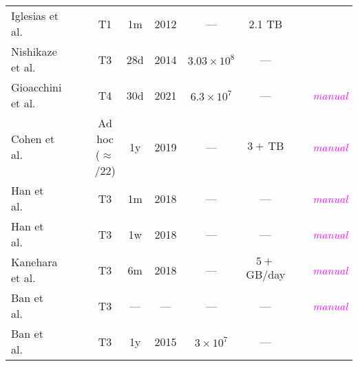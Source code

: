\documentclass[manuscript,nonacm]{acmart}
\newcommand{\cmark}{\ding{51}}%
\newcommand{\xmark}{\ding{55}}%
\newcommand{\wc}[1]{\textit{\textcolor{magenta}{#1}}} %
\begin{document}
\begin{table*}[h!]
\begin{tabular}{@{}lccccccccc@{}}
		Iglesias et al.~\cite{2019iglesias}                    
		& \xmark & \cmark           
		& T1
		& 1m    & 2012    
		& ---                  
		& 2.1 TB        
		& \xmark            
		& \xmark          \\
		
		Nishikaze et al.~\cite{2015nishikaze}                  
		& \xmark & \xmark           
		& T3         
		& 28d   & 2014    
		& $3.03\times10^{8}$
		& ---              
		& \xmark            
		& \xmark          \\
		
		Gioacchini et al.~\cite{2021gioacchini,2023gioacchini} 
		& \cmark & \cmark           
		& T4           
		& 30d   & 2021    
		& $6.3\times10^{7}$ 
		& ---              
		& \cmark~\cite{2020cohen} 
		& \wc{manual}    \\
		
		Cohen et al.~\cite{2020cohen}                          
		& \xmark & \cmark 
		& Ad hoc ($\approx$/22)		              
		& 1y    & 2019    
		& ---                  
		& $3+\,\mathrm{TB}$ 
		& \cmark~\cite{2016ban} 
		& \wc{manual}    \\
		
		Han et al.~\cite{2021han,2022han}                      
		& \cmark & \xmark           
		& T3          
		& 1m    & 2018    
		& ---                  
		& ---              
		& \cmark            
		& \wc{manual}    \\
		
		Han et al.~\cite{2020han,2022han}                      
		& \cmark & \cmark           
		& T3           
		& 1w    & 2018    
		& ---                  
		& ---              
		& \cmark            
		& \wc{manual}    \\
		
		Kanehara et al.~\cite{2019kanehara,2022han}            
		& \xmark & \cmark           
		& T3          
		& 6m    & 2018    
		& ---                  
		& $5+$ GB/day   
		& \cmark            
		& \wc{manual}    \\
		
		Ban et al.~\cite{2017ban}                              
		& \xmark & \xmark           
		& T3          
		& ---     & ---       
		& ---                  
		& ---              
		& \xmark            
		& \wc{manual}    \\
		
		Ban et al.~\cite{2016ban}                              
		& \xmark & \xmark           
		& T3        
		& 1y    & 2015    
		& $3\times10^{7}$  
		& ---              
		& \xmark            
		& \xmark          \\
		

\end{tabular}
\end{table*}
\end{document}
